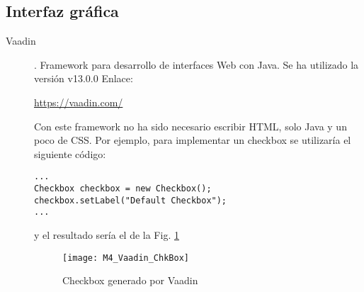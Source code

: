 \subsection{Interfaz gráfica}
\begin{description}
	\item[Vaadin]. Framework para desarrollo de interfaces Web con Java.
		Se ha utilizado la versión  v13.0.0 Enlace:
		
		\url{https://vaadin.com/}
		
		Con este framework no ha sido necesario escribir HTML, solo Java y un poco de CSS. Por ejemplo, para implementar un checkbox se utilizaría el siguiente código:
		
\begin{minipage}{\linewidth}
{\tiny \begin{lstlisting}
...
Checkbox checkbox = new Checkbox();
checkbox.setLabel("Default Checkbox");
...
\end{lstlisting}}
\end{minipage}	
		y el resultado sería el de la Fig. \ref{fig:M4_Vaadin_ChkBox}
\begin{figure}[!h]
	\centering
	\texttt{[image: M4\_Vaadin\_ChkBox]}
	\caption{Checkbox generado por Vaadin}\label{fig:M4_Vaadin_ChkBox}
\end{figure}
\FloatBarrier

\end{description}
